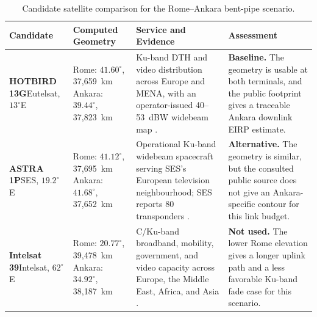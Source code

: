 \begin{table}[H]
    \centering
    \caption{Candidate satellite comparison for the Rome--Ankara bent-pipe scenario.}
    \label{tab:satellite_selection}
    \vspace{0.12cm}
    {\footnotesize
    \setlength{\tabcolsep}{4pt}
    \renewcommand{\arraystretch}{1.28}
    \begin{tabularx}{\textwidth}{@{}
        >{\raggedright\arraybackslash}p{}
        >{\raggedright\arraybackslash}p{}
        >{\raggedright\arraybackslash}p{}
        >{\raggedright\arraybackslash}p{}@{}}
        \rowcolor{tableHeader}
        \color{white}\textbf{Candidate} &
        \color{white}\textbf{Computed Geometry} &
        \color{white}\textbf{Service and Evidence} &
        \color{white}\textbf{Assessment} \\
        \midrule
        \rowcolor{tableSelected}
        \textbf{HOTBIRD 13G}\newline Eutelsat, $13^\circ$E &
        Rome: $41.60^\circ$, 37,659~km\newline
        Ankara: $39.44^\circ$, 37,823~km &
        Ku-band DTH and video distribution across Europe and MENA, with an operator-issued 40--53~dBW widebeam map \cite{eutelsat}. &
        \textbf{Baseline.} The geometry is usable at both terminals, and the public footprint gives a traceable Ankara downlink EIRP estimate. \\
        \addlinespace[2pt]
        \textbf{ASTRA 1P}\newline SES, $19.2^\circ$E &
        Rome: $41.12^\circ$, 37,695~km\newline
        Ankara: $41.68^\circ$, 37,652~km &
        Operational Ku-band widebeam spacecraft serving SES's European television neighbourhood; SES reports 80 transponders \cite{ses_astra1p}. &
        \textbf{Alternative.} The geometry is similar, but the consulted public source does not give an Ankara-specific contour for this link budget. \\
        \addlinespace[2pt]
        \textbf{Intelsat 39}\newline Intelsat, $62^\circ$E &
        Rome: $20.77^\circ$, 39,478~km\newline
        Ankara: $34.92^\circ$, 38,187~km &
        C/Ku-band broadband, mobility, government, and video capacity across Europe, the Middle East, Africa, and Asia \cite{intelsat39}. &
        \textbf{Not used.} The lower Rome elevation gives a longer uplink path and a less favorable Ku-band fade case for this scenario. \\
        \bottomrule
    \end{tabularx}
    }
\end{table}

